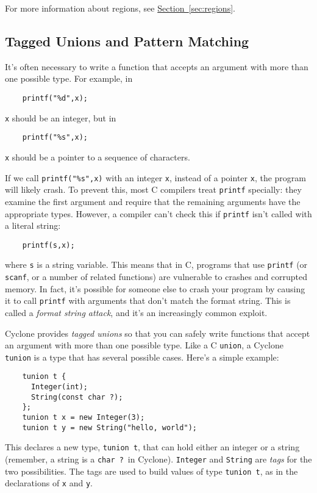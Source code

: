For more information about regions, see
\hyperref[{sec:regions}]{Section~\ref{sec:regions}}.

\subsection{Tagged Unions and Pattern Matching}

It's often necessary to write a function that accepts an argument with
more than one possible type.  For example, in
\begin{verbatim}
    printf("%d",x);
\end{verbatim}
\texttt{x} should be an integer, but in
\begin{verbatim}
    printf("%s",x);
\end{verbatim}
\texttt{x} should be a pointer to a sequence of characters.

If we call \texttt{printf("\%s",x)} with an integer \texttt{x},
instead of a pointer \texttt{x}, the program will likely crash.
To prevent this, most C compilers treat \texttt{printf} specially:
they examine the first argument and require that the remaining
arguments have the appropriate types.  However, a compiler can't check
this if \texttt{printf} isn't called with a literal string:
\begin{verbatim}
    printf(s,x);
\end{verbatim}
where \texttt{s} is a string variable.  This means that in C, programs
that use \texttt{printf} (or \texttt{scanf}, or a number of related
functions) are vulnerable to crashes and corrupted memory.  In fact,
it's possible for someone else to crash your program by causing it to
call \texttt{printf} with arguments that don't match the format
string.  This is called a \emph{format string attack}, and it's an
increasingly common exploit.

Cyclone provides \emph{tagged unions} so that you can safely write
functions that accept an argument with more than one possible type.
Like a C \texttt{union}, a Cyclone \texttt{tunion} is a type that has
several possible cases.  Here's a simple example:
\begin{verbatim}
    tunion t {
      Integer(int);
      String(const char ?);
    };
    tunion t x = new Integer(3);
    tunion t y = new String("hello, world");
\end{verbatim}
This declares a new type, \texttt{tunion t}, that can hold either an
integer or a string (remember, a string is a \texttt{char ?}\ in
Cyclone).  \texttt{Integer} and \texttt{String} are \emph{tags} for
the two possibilities.  The tags are used to build values of type
\texttt{tunion t}, as in the declarations of \texttt{x} and
\texttt{y}.

